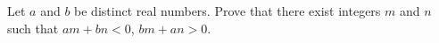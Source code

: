 Let $a$ and $b$ be distinct real numbers. Prove that there exist integers $m$ and $n$ such that $am+bn<0$,  $bm+an>0$.